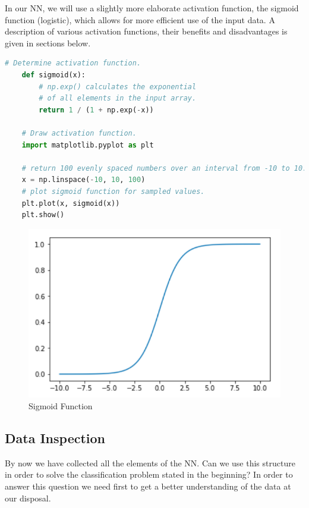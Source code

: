 \begin{itemize}
In our NN, we will use a slightly more elaborate activation function, the sigmoid function (logistic), which allows for more efficient use of the input data. A description of various activation functions, their benefits and disadvantages is given in sections below.

\begin{lstlisting}[language=Python]
    # Determine activation function.
    def sigmoid(x):
        # np.exp() calculates the exponential
        # of all elements in the input array.
        return 1 / (1 + np.exp(-x)) 

    # Draw activation function.
    import matplotlib.pyplot as plt
    
    # return 100 evenly spaced numbers over an interval from -10 to 10.
    x = np.linspace(-10, 10, 100) 
    # plot sigmoid function for sampled values.
    plt.plot(x, sigmoid(x)) 
    plt.show()
\end{lstlisting}

\begin{figure}[H]
    \includegraphics[width=\linewidth]{pics/sigmoid.png}
    \caption{\label{fig:sigmoid-fct} Sigmoid Function}
\end{figure}

\end{itemize}


\subsection{Data Inspection}

By now we have collected all the elements of the NN. Can we use this structure in order to solve the classification problem stated in the beginning? In order to answer this question we need first to get a better understanding of the data at our disposal. 

